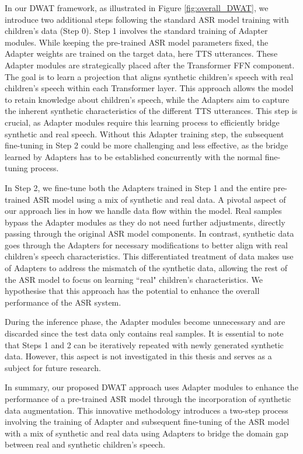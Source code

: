 In our \ac{DWAT}  framework, as illustrated in Figure \ref{fig:overall_DWAT}, we introduce two additional steps following the standard \ac{ASR} model training with children's data (Step 0).
Step 1 involves the standard training of Adapter modules. While keeping the pre-trained \ac{ASR} model parameters fixed, the Adapter weights are trained on the target data, here \ac{TTS} utterances. These Adapter modules are strategically placed after the Transformer \ac{FFN} component. The goal is to learn a projection that aligns synthetic children's speech with real children's speech within each Transformer layer. This approach allows the model to retain knowledge about children's speech, while the Adapters aim to capture the inherent synthetic characteristics of the different \ac{TTS} utterances. This step is crucial, as Adapter modules require this learning process to efficiently bridge synthetic and real speech. Without this Adapter training step, the subsequent fine-tuning in Step 2 could be more challenging and less effective, as the bridge learned by Adapters has to be established concurrently with the normal fine-tuning process.

In Step 2, we fine-tune both the Adapters trained in Step 1 and the entire pre-trained \ac{ASR} model using a mix of synthetic and real data. A pivotal aspect of our approach lies in how we handle data flow within the model. Real samples bypass the Adapter modules as they do not need further adjustments, directly passing through the original \ac{ASR} model components. In contrast, synthetic data goes through the Adapters for necessary modifications to better align with real children's speech characteristics. This differentiated treatment of data makes use of Adapters to address the mismatch of the synthetic data, allowing the rest of the \ac{ASR} model to focus on learning ``real" children's characteristics. We hypothesise that this approach has the potential to enhance the overall performance of the \ac{ASR} system.

During the inference phase, the Adapter modules become unnecessary and are discarded since the test data only contains real samples. It is essential to note that Steps 1 and 2 can be iteratively repeated with newly generated synthetic data. However, this aspect is not investigated in this thesis and serves as a subject for future research.

In summary, our proposed \ac{DWAT} approach uses Adapter modules to enhance the performance of a pre-trained \ac{ASR} model through the incorporation of synthetic data augmentation. This innovative methodology introduces a two-step process involving the training of Adapter and subsequent fine-tuning of the \ac{ASR} model with a mix of synthetic and real data using Adapters to bridge the domain gap between real and synthetic children's speech.


